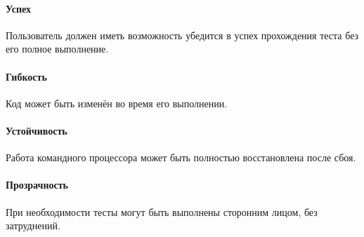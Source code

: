 \paragraph{Успех}

Пользователь должен иметь возможность убедится в успех прохождения теста без его полное выполнение.

\paragraph{Гибкость}

Код может быть изменён во время его выполнении.

\paragraph{Устойчивость}

Работа командного процессора может быть полностью восстановлена после сбоя.

\paragraph{Прозрачность}

При необходимости тесты могут быть выполнены сторонним лицом, без затруднений.
